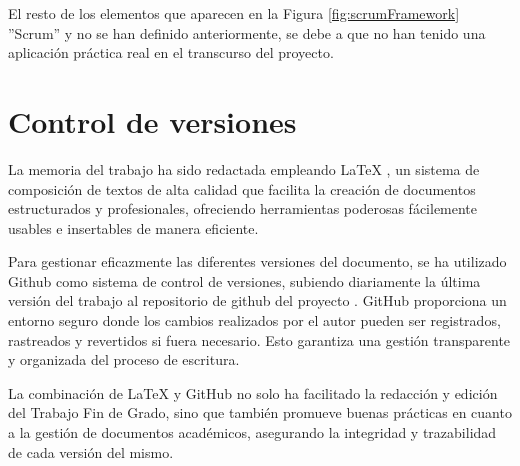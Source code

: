 El resto de los elementos que aparecen en la Figura \ref{fig:scrumFramework} ''Scrum'' y no se han definido anteriormente, se debe a que no han tenido una aplicación práctica real en el transcurso del proyecto.

\section{Control de versiones} \label{sec:04cvs}

La memoria del trabajo ha sido redactada empleando LaTeX \parencite{latex}, un sistema de composición de textos de alta calidad que facilita la creación de documentos estructurados y profesionales, ofreciendo herramientas poderosas fácilemente usables e insertables de manera eficiente.

Para gestionar eficazmente las diferentes versiones del documento, se ha utilizado Github como sistema de control de versiones, subiendo diariamente la última versión del trabajo al repositorio de github del proyecto \parencite{vallealonsodc}. GitHub proporciona un entorno seguro donde los cambios realizados por el autor pueden ser registrados, rastreados y revertidos si fuera necesario. Esto garantiza una gestión transparente y organizada del proceso de escritura.

La combinación de LaTeX y GitHub no solo ha facilitado la redacción y edición del Trabajo Fin de Grado, sino que también promueve buenas prácticas en cuanto a la gestión de documentos académicos, asegurando la integridad y trazabilidad de cada versión del mismo.